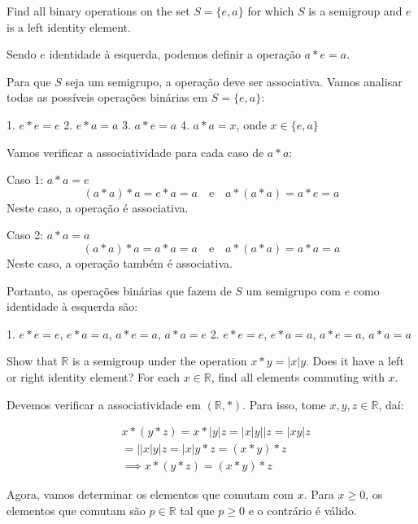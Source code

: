 \begin{exercicio}{1.41}
	Find all binary operations on the set \(S=\{e, a\}\) for which $S$ is a semigroup and $e$ is a left identity element.
\end{exercicio}

\begin{solucao}
	Sendo $e$ identidade à esquerda, podemos definir a operação $a * e = a$.

	Para que $S$ seja um semigrupo, a operação deve ser associativa. Vamos analisar todas as possíveis operações binárias em $S = \{e, a\}$:

	1. \( e * e = e \)
	2. \( e * a = a \)
	3. \( a * e = a \)
	4. \( a * a = x \), onde \( x \in \{e, a\} \)

	Vamos verificar a associatividade para cada caso de \( a * a \):

	Caso 1: \( a * a = e \)
	\[
	(a * a) * a = e * a = a \quad \text{e} \quad a * (a * a) = a * e = a
	\]
	Neste caso, a operação é associativa.

	Caso 2: \( a * a = a \)
	\[
	(a * a) * a = a * a = a \quad \text{e} \quad a * (a * a) = a * a = a
	\]
	Neste caso, a operação também é associativa.

	Portanto, as operações binárias que fazem de \( S \) um semigrupo com \( e \) como identidade à esquerda são:

	1. \( e * e = e \), \( e * a = a \), \( a * e = a \), \( a * a = e \)
	2. \( e * e = e \), \( e * a = a \), \( a * e = a \), \( a * a = a \)
\end{solucao}

\begin{exercicio}{1.42}
	Show that $\mathbb{R}$ is a semigroup under the operation $x * y = |x|y$. Does it have a left or right identity element? For each $x \in \mathbb{R}$, find all elements commuting with $x$.
\end{exercicio}

\begin{solucao}
	Devemos verificar a associatividade em \((\mathbb{R}, *)\). Para isso, tome $x, y, z \in \mathbb{R}$, daí:

	\begin{align*}
		&x * (y * z) = x * |y|z = |x|y||z = |xy|z \\
		& =||x|y|z = |x|y * z = (x * y) * z \\
		& \implies x * (y * z) = (x * y) * z
	\end{align*}

	Agora, vamos determinar os elementos que comutam com \(x\). Para $x \geq  0$, os elementos que comutam são $p \in \mathbb{R}$ tal que $p \geq 0$ e o contrário é válido.
\end{solucao}

